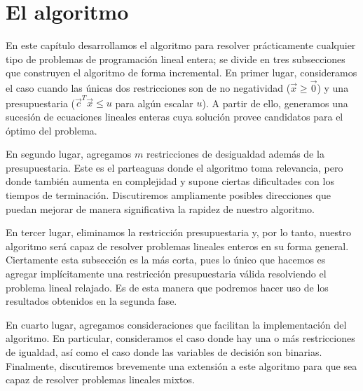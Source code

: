 \chapter{El algoritmo}


\noindent
En este capítulo desarrollamos el algoritmo para resolver prácticamente cualquier tipo de problemas
de programación lineal entera; se divide en tres subsecciones que construyen el algoritmo de forma
incremental. En primer lugar, consideramos el caso cuando las únicas dos restricciones son de no
negatividad ($\vec{x} \geq \vec{0}$) y una presupuestaria ($\vec{c}^T\vec{x} \leq u$ para algún
escalar $u$). A partir de ello, generamos una sucesión de ecuaciones lineales enteras cuya solución
provee candidatos para el óptimo del problema.

En segundo lugar, agregamos $m$ restricciones de desigualdad además de la presupuestaria. Este es el
parteaguas donde el algoritmo toma relevancia, pero donde también aumenta en complejidad y supone
ciertas dificultades con los tiempos de terminación. Discutiremos ampliamente posibles direcciones
que puedan mejorar de manera significativa la rapidez de nuestro algoritmo.

En tercer lugar, eliminamos la restricción presupuestaria y, por lo tanto, nuestro algoritmo será
capaz de resolver problemas lineales enteros en su forma general. Ciertamente esta subsección es
la más corta, pues lo único que hacemos es agregar implícitamente una restricción presupuestaria
válida resolviendo el problema lineal relajado. Es de esta manera que podremos hacer uso de los
resultados obtenidos en la segunda fase.

En cuarto lugar, agregamos consideraciones que facilitan la implementación del algoritmo. En
particular, consideramos el caso donde hay una o más restricciones de igualdad, así como el caso
donde las variables de decisión son binarias. Finalmente, discutiremos brevemente una extensión a
este algoritmo para que sea capaz de resolver problemas lineales mixtos.

